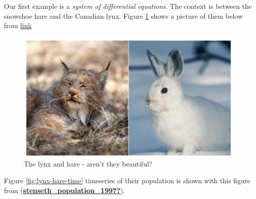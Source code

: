 \documentclass[
]{book}
\theoremstyle{definition}
\theoremstyle{definition}
\theoremstyle{definition}
\theoremstyle{remark}
\begin{document}
Our first example is a \emph{system of differential equations}. The context is between the snowshoe hare and the Canadian lynx. Figure \ref{fig:lynx-hare} shows a picture of them below from \href{https://www.cbc.ca/news/canada/north/canseq150-genome-sequencing-lynx-hare-1.4676308}{link}

\begin{figure}
\includegraphics[width=20.44in]{figures/03-systems/lynx-hare} \caption{The lynx and hare - aren't they beautiful?}\label{fig:lynx-hare}
\end{figure}

Figure \ref{fig:lynx-hare-time} timeseries of their population is shown with this figure from (\protect\hyperlink{ref-stenseth_population_1997}{\textbf{stenseth\_population\_1997?}}).
\end{document}
